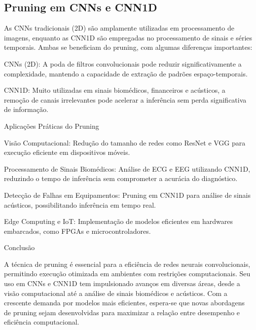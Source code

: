 \subsection{Pruning em CNNs e CNN1D}

As CNNs tradicionais (2D) são amplamente utilizadas em processamento de imagens, enquanto as CNN1D são empregadas no processamento de sinais e séries temporais. Ambas se beneficiam do pruning, com algumas diferenças importantes:

CNNs (2D): A poda de filtros convolucionais pode reduzir significativamente a complexidade, mantendo a capacidade de extração de padrões espaço-temporais.

CNN1D: Muito utilizadas em sinais biomédicos, financeiros e acústicos, a remoção de canais irrelevantes pode acelerar a inferência sem perda significativa de informação.

Aplicações Práticas do Pruning

Visão Computacional: Redução do tamanho de redes como ResNet e VGG para execução eficiente em dispositivos móveis.

Processamento de Sinais Biomédicos: Análise de ECG e EEG utilizando CNN1D, reduzindo o tempo de inferência sem comprometer a acurácia do diagnóstico.

Detecção de Falhas em Equipamentos: Pruning em CNN1D para análise de sinais acústicos, possibilitando inferência em tempo real.

Edge Computing e IoT: Implementação de modelos eficientes em hardwares embarcados, como FPGAs e microcontroladores.

Conclusão

A técnica de pruning é essencial para a eficiência de redes neurais convolucionais, permitindo execução otimizada em ambientes com restrições computacionais. Seu uso em CNNs e CNN1D tem impulsionado avanços em diversas áreas, desde a visão computacional até a análise de sinais biomédicos e acústicos. Com a crescente demanda por modelos mais eficientes, espera-se que novas abordagens de pruning sejam desenvolvidas para maximizar a relação entre desempenho e eficiência computacional.